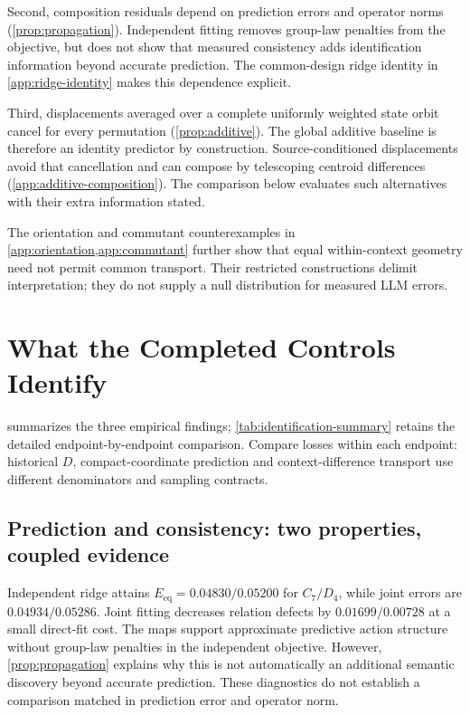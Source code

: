 \documentclass{article}
\newcommand{\Eeq}{E_{\mathrm{eq}}}
\begin{document}
Second, composition residuals depend on prediction errors and operator norms (\cref{prop:propagation}). Independent fitting removes group-law penalties from the objective, but does not show that measured consistency adds identification information beyond accurate prediction. The common-design ridge identity in \cref{app:ridge-identity} makes this dependence explicit.

Third, displacements averaged over a complete uniformly weighted state orbit cancel for every permutation (\cref{prop:additive}). The global additive baseline is therefore an identity predictor by construction. Source-conditioned displacements avoid that cancellation and can compose by telescoping centroid differences (\cref{app:additive-composition}). The comparison below evaluates such alternatives with their extra information stated.

The orientation and commutant counterexamples in \cref{app:orientation,app:commutant} further show that equal within-context geometry need not permit common transport. Their restricted constructions delimit interpretation; they do not supply a null distribution for measured LLM errors.

\section{What the Completed Controls Identify}
\label{sec:evidence}
 summarizes the three empirical findings; \cref{tab:identification-summary} retains the detailed endpoint-by-endpoint comparison. Compare losses within each endpoint: historical $D$, compact-coordinate prediction and context-difference transport use different denominators and sampling contracts.

\subsection{Prediction and consistency: two properties, coupled evidence}
Independent ridge attains $\Eeq=0.04830/0.05200$ for $C_7/D_4$, while joint errors are $0.04934/0.05286$. Joint fitting decreases relation defects by $0.01699/0.00728$ at a small direct-fit cost. The maps support approximate predictive action structure without group-law penalties in the independent objective. However, \cref{prop:propagation} explains why this is not automatically an additional semantic discovery beyond accurate prediction. These diagnostics do not establish a comparison matched in prediction error and operator norm.
\end{document}
